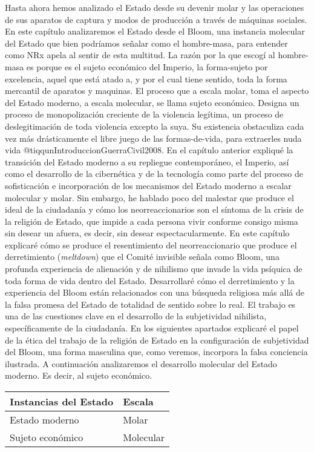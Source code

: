 \documentclass[
]{article}
\begin{document}
Hasta ahora hemos analizado el Estado desde su devenir molar y las
operaciones de sus aparatos de captura y modos de producción a través de
máquinas sociales. En este capítulo analizaremos el Estado desde el
Bloom, una instancia molecular del Estado que bien podríamos señalar
como el hombre-masa, para entender como NRx apela al sentir de esta
multitud. La razón por la que escogí al hombre-masa es porque es el
sujeto económico del Imperio, la forma-sujeto por excelencia, aquel que
está atado a, y por el cual tiene sentido, toda la forma mercantil de
aparatos y maquinas. El proceso que a escala molar, toma el aspecto del
Estado moderno, a escala molecular, se llama sujeto económico. Designa
un proceso de monopolización creciente de la violencia legítima, un
proceso de deslegitimación de toda violencia excepto la suya. Su
existencia obstaculiza cada vez más drásticamente el libre juego de las
formas-de-vida, para extraerles nuda vida
@tiqqunIntroduccionGuerraCivil2008. En el capítulo anterior expliqué la
transición del Estado moderno a su repliegue contemporáneo, el Imperio,
así como el desarrollo de la cibernética y de la tecnología como parte
del proceso de sofisticación e incorporación de los mecanismos del
Estado moderno a escalar molecular y molar. Sin embargo, he hablado poco
del malestar que produce el ideal de la ciudadanía y cómo los
neorreaccionarios son el síntoma de la crisis de la religión de Estado,
que impide a cada persona vivir conforme consigo misma sin desear un
afuera, es decir, sin desear espectacularmente. En este capítulo
explicaré cómo se produce el resentimiento del neorreaccionario que
produce el derretimiento (\emph{meltdown}) que el Comité invisible
señala como Bloom, una profunda experiencia de alienación y de nihilismo
que invade la vida psíquica de toda forma de vida dentro del Estado.
Desarrollaré cómo el derretimiento y la experiencia del Bloom están
relacionados con una búsqueda religiosa más allá de la falsa promesa del
Estado de totalidad de sentido sobre lo real. El trabajo es una de las
cuestiones clave en el desarrollo de la subjetividad nihilista,
específicamente de la ciudadanía. En los siguientes apartados explicaré
el papel de la ética del trabajo de la religión de Estado en la
configuración de subjetividad del Bloom, una forma masculina que, como
veremos, incorpora la falsa conciencia ilustrada. A continuación
analizaremos el desarrollo molecular del Estado moderno. Es decir, al
sujeto económico.

\begin{longtable}[]{@{}ll@{}}
\toprule
\textbf{Instancias del Estado} & \textbf{Escala}\tabularnewline
\midrule
\endhead
Estado moderno & Molar\tabularnewline
Sujeto económico & Molecular\tabularnewline
\bottomrule
\end{longtable}
\end{document}
